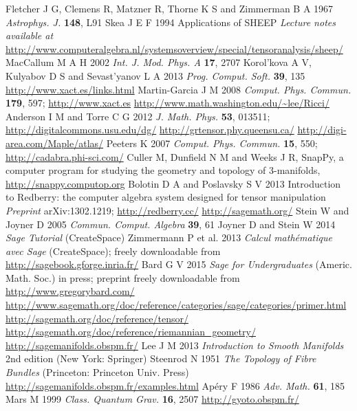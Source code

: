 \documentclass[a4paper]{jpconf}
\begin{document}
\begin{thebibliography}{10}
Fletcher J G, Clemens R, Matzner R, Thorne K S and Zimmerman B A 1967
{\it Astrophys. J.} {\bf 148}, L91
Skea J E F 1994 Applications of SHEEP {\it Lecture notes available at}
\url{http://www.computeralgebra.nl/systemsoverview/special/tensoranalysis/sheep/}
MacCallum M A H 2002 {\it Int. J. Mod. Phys. A} {\bf 17}, 2707 
Korol'kova A V, Kulyabov D S and Sevast'yanov L A 2013 {\it Prog. Comput. Soft.} 
{\bf 39}, 135
\url{http://www.xact.es/links.html}
Martin-Garcia J M 2008 {\it Comput. Phys. Commun.} {\bf 179}, 597; 
\url{http://www.xact.es}
\url{http://www.math.washington.edu/~lee/Ricci/}
Anderson I M and Torre C G 2012 {\it J. Math. Phys.} {\bf 53}, 013511; 
\url{http://digitalcommons.usu.edu/dg/}
\url{http://grtensor.phy.queensu.ca/}
\url{http://digi-area.com/Maple/atlas/}
Peeters K 2007 {\it Comput. Phys. Commun.} {\bf 15}, 550;
\url{http://cadabra.phi-sci.com/}
Culler M, Dunfield N M and Weeks J R, SnapPy, a computer program for studying the geometry and topology of 3-manifolds, \url{http://snappy.computop.org}
Bolotin D A and Poslavsky S V 2013 Introduction to Redberry: the computer algebra system designed for tensor manipulation {\it Preprint} arXiv:1302.1219;
\url{http://redberry.cc/}
\url{http://sagemath.org/}
Stein W and Joyner D 2005 {\it Commun. Comput. Algebra} {\bf 39}, 61
Joyner D and Stein W 2014 {\it Sage Tutorial} (CreateSpace)
Zimmermann P et al. 2013 {\it Calcul math\'ematique avec Sage} (CreateSpace); 
freely downloadable from \url{http://sagebook.gforge.inria.fr/}
Bard G V 2015 {\it Sage for Undergraduates} (Americ. Math. Soc.) in press;
preprint freely downloadable from \url{http://www.gregorybard.com/}
\url{http://www.sagemath.org/doc/reference/categories/sage/categories/primer.html}
\url{http://sagemath.org/doc/reference/tensor/}
\url{http://sagemath.org/doc/reference/riemannian_geometry/}
\url{http://sagemanifolds.obspm.fr/}
Lee J M 2013 {\it Introduction to Smooth Manifolds} 2nd edition (New York: Springer)
Steenrod N 1951 {\it The Topology of Fibre Bundles} (Princeton: Princeton Univ. Press)
\url{http://sagemanifolds.obspm.fr/examples.html}
Ap\'ery F 1986 {\it Adv. Math.} {\bf 61}, 185
Mars M 1999 {\it Class. Quantum Grav.} {\bf 16}, 2507
\url{http://gyoto.obspm.fr/}
\end{thebibliography}
\end{document}
